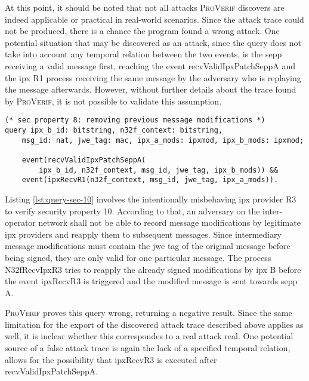 At this point, it should be noted that not all attacks \textsc{ProVerif} discovers are indeed applicable or practical in real-world scenarios.
Since the attack trace could not be produced, there is a chance the program found a wrong attack.
One potential situation that may be discovered as an attack, since the query does not take into account any temporal relation between the two events, is the \gls{sepp} receiving a valid message first, reaching the event {\sffamily recvValidIpxPatchSeppA} and the \gls{ipx} R1 process receiving the same message by the adversary who is replaying the message afterwards.
However, without further details about the trace found by \textsc{ProVerif}, it is not possible to validate this assumption.

\begin{lstlisting}[caption={Query for security property 8},label={lst:query-sec-8},firstnumber=348]
(* sec property 8: removing previous message modifications *)
query ipx_b_id: bitstring, n32f_context: bitstring,
    msg_id: nat, jwe_tag: mac, ipx_a_mods: ipxmod, ipx_b_mods: ipxmod;

    event(recvValidIpxPatchSeppA(
        ipx_b_id, n32f_context, msg_id, jwe_tag, ipx_b_mods)) &&
    event(ipxRecvR1(n32f_context, msg_id, jwe_tag, ipx_a_mods)).
\end{lstlisting}

Listing \ref{lst:query-sec-10} involves the intentionally misbehaving \gls{ipx} provider R3 to verify security property 10.
According to that, an adversary on the inter-operator network shall not be able to record message modifications by legitimate \gls{ipx} providers and reapply them to subsequent messages.
Since intermediary message modifications must contain the \gls{jwe} tag of the original message before being signed, they are only valid for one particular message.
The process {\sffamily N32fRecvIpxR3} tries to reapply the already signed modifications by \gls{ipx} B before the event {\sffamily ipxRecvR3} is triggered and the modified message is sent towards \gls{sepp} A.

\textsc{ProVerif} proves this query wrong, returning a negative result.
Since the same limitation for the export of the discovered attack trace described above applies as well, it is inclear whether this correspondes to a real attack real.
One potential source of a false attack trace is again the lack of a specified temporal relation, allows for the possibility that {\sffamily ipxRecvR3} is executed after {\sffamily recvValidIpxPatchSeppA}.

